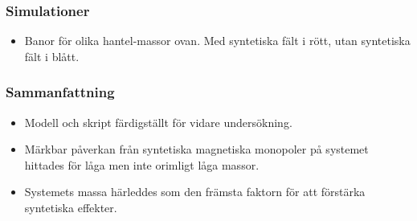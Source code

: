 \documentclass[aspectratio=169]{beamer}
\begin{document}
\begin{frame}
        \frametitle{Simulationer}
    \begin{figure}[h]
        \centering
        \qquad  
    \end{figure}
    \begin{itemize}
            \item Banor för olika hantel-massor ovan. Med syntetiska fält i rött, utan syntetiska fält i blått.
    \end{itemize}
\end{frame}
\begin{frame}
        \frametitle{Sammanfattning}
        \begin{itemize}
                \item Modell och skript färdigställt för vidare undersökning.
                \item Märkbar påverkan från syntetiska magnetiska monopoler på systemet
                        hittades för låga men inte orimligt låga massor.
                \item Systemets massa härleddes som den främsta faktorn för att förstärka
                        syntetiska effekter.
        \end{itemize}
        
\end{frame}
\end{document}
